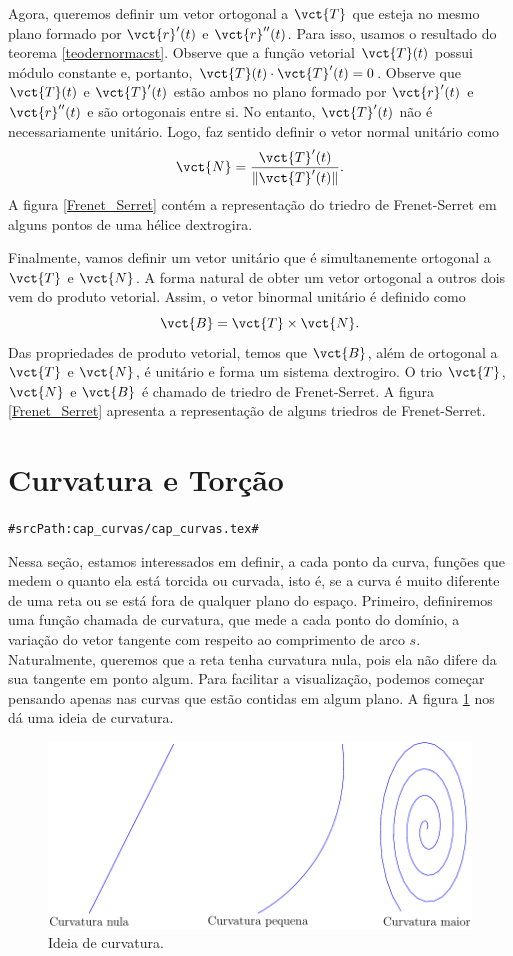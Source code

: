 Agora, queremos definir um vetor ortogonal a $\vct{T}$ que esteja no mesmo plano formado por $\vct{r}'(t)$ e $\vct{r}''(t)$. Para isso, usamos o resultado do teorema \ref{teodernormacst}. Observe que a função vetorial $\vct{T}(t)$ possui módulo constante e, portanto, $\vct{T}(t)\cdot \vct{T}'(t)=0$. Observe que $\vct{T}(t)$ e $\vct{T}'(t)$ estão ambos no plano formado por $\vct{r}'(t)$ e $\vct{r}''(t)$ e são ortogonais entre si. No entanto, $\vct{T}'(t)$ não é necessariamente unitário. Logo, faz sentido definir o vetor normal unitário como
$$
\vct{N}=\frac{\vct{T}'(t)}{\|\vct{T}'(t)\|}.
$$
A figura \ref{Frenet_Serret} contém a representação do triedro de Frenet-Serret em alguns pontos de uma hélice dextrogira.

Finalmente, vamos definir um vetor unitário que é simultanemente ortogonal a $\vct{T}$ e $\vct{N}$. A forma natural de obter um vetor ortogonal a outros dois vem do produto vetorial. Assim, o vetor binormal unitário é definido como
$$
\vct{B}=\vct{T}\times\vct{N}.
$$
Das propriedades de produto vetorial, temos que $\vct{B}$, além de ortogonal a $\vct{T}$ e $\vct{N}$, é unitário e forma um sistema dextrogiro. O trio $\vct{T}$, $\vct{N}$ e $\vct{B}$ é chamado de triedro de Frenet-Serret. A figura \ref{Frenet_Serret} apresenta a representação de alguns triedros de Frenet-Serret.


\section{Curvatura e Torção}
\verb+#srcPath:cap_curvas/cap_curvas.tex#+


Nessa seção, estamos interessados em definir, a cada ponto da curva, funções que medem o quanto ela está torcida ou curvada, isto é, se a curva é muito diferente de uma reta ou se está fora de qualquer plano do espaço. Primeiro, definiremos uma função chamada de curvatura, que mede a cada ponto do domínio, a variação do vetor tangente com respeito ao comprimento de arco $s$. Naturalmente, queremos que a reta tenha curvatura nula, pois ela não difere da sua tangente em ponto algum. Para facilitar a visualização, podemos começar pensando apenas nas curvas que estão contidas em algum plano. A figura \ref{curvatura} nos dá uma ideia de curvatura.


\begin{figure}
\begin{center}
    \includegraphics{./cap_curvas/figs/exemplos_de_curvatura}
 \caption{Ideia de curvatura.\label{curvatura}}
  \end{center}
\end{figure}
 
